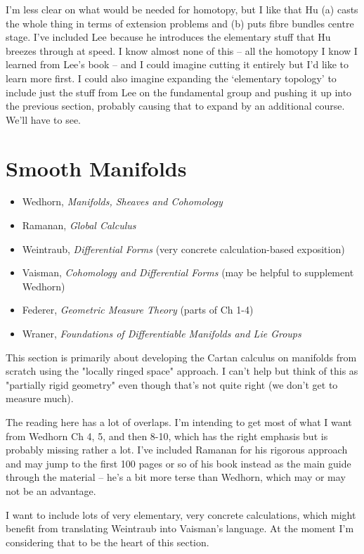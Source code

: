 \documentclass[article]{article}
\begin{document}
I'm less clear on what would be needed for homotopy, but I like that Hu (a) casts the whole thing in terms of extension problems and (b) puts fibre bundles centre stage. I've included Lee because he introduces the elementary stuff that Hu breezes through at speed. I know almost none of this -- all the homotopy I know I learned from Lee's book -- and I could imagine cutting it entirely but I'd like to learn more first. I could also imagine expanding the `elementary topology' to include just the stuff from Lee on the fundamental group and pushing it up into the previous section, probably causing that to expand by an additional course. We'll have to see.

\section{Smooth Manifolds}

\begin{itemize}
	\item{Wedhorn, \textit{Manifolds, Sheaves and Cohomology}}
	\item{Ramanan, \textit{Global Calculus}}
	\item{Weintraub, \textit{Differential Forms} (very concrete calculation-based exposition)}
	\item{Vaisman, \textit{Cohomology and Differential Forms} (may be helpful to supplement Wedhorn)}
	\item{Federer, \textit{Geometric Measure Theory} (parts of Ch 1-4)}
	\item{Wraner, \textit{Foundations of Differentiable Manifolds and Lie Groups}}
\end{itemize}

This section is primarily about developing the Cartan calculus on manifolds from scratch using the "locally ringed space" approach. I can't help but think of this as "partially rigid geometry" even though that's not quite right (we don't get to measure much).

The reading here has a lot of overlaps. I'm intending to get most of what I want from Wedhorn Ch 4, 5, and then 8-10, which has the right emphasis but is probably missing rather a lot. I've included Ramanan for his rigorous approach and may jump to the first 100 pages or so of his book instead as the main guide through the material -- he's a bit more terse than Wedhorn, which may or may not be an advantage.

I want to include lots of very elementary, very concrete calculations, which might benefit from translating Weintraub into Vaisman's language. At the moment I'm considering that to be the heart of this section.
\end{document}
